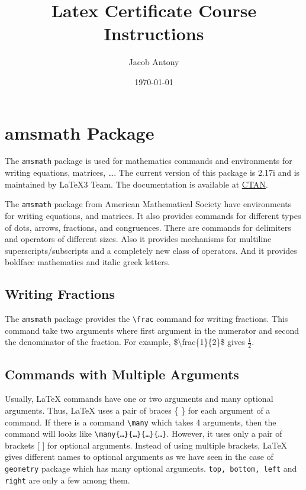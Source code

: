 \documentclass{article}
\title{Latex Certificate Course Instructions}
\author{Jacob Antony}
\date{\today}
\begin{document}
\maketitle

\section{amsmath Package}
	The \texttt{amsmath} package is used for mathematics commands and environments for writing equations, matrices, \dots. The current version of this package is 2.17i and is maintained by \LaTeX3{} Team. The documentation is available at \href{https://ctan.org/pkg/amsmath}{CTAN}.
	
	The \texttt{amsmath} package from American Mathematical Society have environments for writing equations, and matrices. It also provides commands for different types of dots, arrows, fractions, and congruences. There are commands for delimiters and operators of different sizes. Also it provides mechanisms for multiline superscripts/subscripts and a completely new class of operators. And it provides boldface mathematics and italic greek letters.

\subsection{Writing Fractions}
	The \texttt{amsmath} package provides the \texttt{\textbackslash frac} command for writing fractions. This command take two arguments where first argument in the numerator and second the denominator of the fraction. For example, \$\textbackslash frac\{1\}\{2\}\$ gives $\frac{1}{2}$.

\subsection{Commands with Multiple Arguments}
	 Usually, \LaTeX{} commands have one or two arguments and many optional arguments. Thus, \LaTeX{} uses a pair of braces \{ \} for each argument of a command. If there is a command \texttt{\textbackslash many} which takes 4 arguments, then the command will looks like \texttt{\textbackslash many\{\dots\}\{\dots\}\{\dots\}\{\dots\}}. However, it uses only a pair of brackets [ ] for optional arguments. Instead of using multiple brackets, \LaTeX{} gives different names to optional arguments as we have seen in the case of \texttt{geometry} package which has many optional arguments. \texttt{top, bottom, left} and \texttt{right} are only a few among them.
\end{document}

